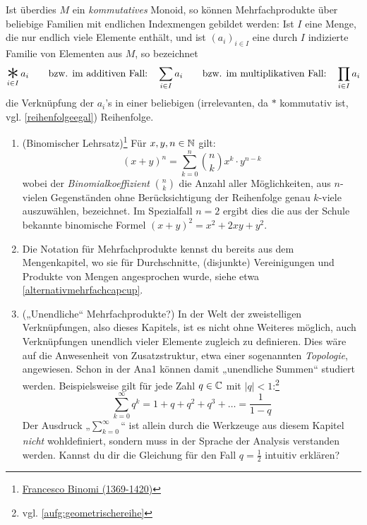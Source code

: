 \begin{nota}[Mehrfachprodukte]
    Ist überdies $M$ ein \emph{kommutatives} Monoid, so können Mehrfachprodukte über beliebige Familien mit endlichen Indexmengen gebildet werden: Ist $I$ eine Menge, die nur endlich viele Elemente enthält, und ist $(a_i)_{i\in I}$ eine durch $I$ indizierte Familie von Elementen aus $M$, so bezeichnet
        \[ \mathop{\raisebox{-0.6ex}{\scalebox{2.5}{$*$}}}_{i\in I} a_i \qquad\text{bzw. im additiven Fall:}\quad \sum_{i\in I} a_i \qquad\text{bzw. im multiplikativen Fall:}\quad \prod_{i\in I} a_i\]
    die Verknüpfung der $a_i$'s in einer beliebigen (irrelevanten, da $*$ kommutativ ist, vgl. \cref{reihenfolgeegal}) Reihenfolge.
\end{nota}


\begin{bsp} \quad
    \begin{enumerate}
        \item(Binomischer Lehrsatz)\footnote{\href{https://www.youtube.com/watch?v=462dkfAvlGo}{Francesco Binomi (1369-1420)}} Für $x,y,n\in \mathbb N$ gilt:
            \[ (x+y)^n = \sum_{k=0}^n \binom{n}{k} x^k\cdot y^{n-k} \]
        wobei der \emph{Binomialkoeffizient} $\binom{n}{k}$ die Anzahl aller Möglichkeiten, aus $n$-vielen Gegenständen ohne Berücksichtigung der Reihenfolge genau $k$-viele auszuwählen, bezeichnet. Im Spezialfall $n=2$ ergibt dies die aus der Schule bekannte binomische Formel $(x+y)^2=x^2+2xy+y^2$.
        \item Die Notation für Mehrfachprodukte kennst du bereits aus dem Mengenkapitel, wo sie für Durchschnitte, (disjunkte) Vereinigungen und Produkte von Mengen angesprochen wurde, siehe etwa \cref{alternativmehrfachcapcup}.
        \item(„Unendliche“ Mehrfachprodukte?) In der Welt der zweistelligen Verknüpfungen, also dieses Kapitels, ist es nicht ohne Weiteres möglich, auch Verknüpfungen unendlich vieler Elemente zugleich zu definieren. Dies wäre auf die Anwesenheit von Zusatzstruktur, etwa einer sogenannten \emph{Topologie}, angewiesen. Schon in der Ana1 können damit „unendliche Summen“ studiert werden. Beispielsweise gilt für jede Zahl $q\in \mathbb C$ mit $\vert q\vert < 1$:\footnote{vgl. \cref{aufg:geometrischereihe}}
            \[ \sum_{k=0}^\infty q^k = 1 + q + q^2 + q^3 + \ldots = \frac{1}{1-q} \]
        Der Ausdruck „$\sum_{k=0}^\infty$“ ist allein durch die Werkzeuge aus diesem Kapitel \emph{nicht} wohldefiniert, sondern muss in der Sprache der Analysis verstanden werden. Kannst du dir die Gleichung für den Fall $q=\frac{1}{2}$ intuitiv erklären?
    \end{enumerate}
\end{bsp}





